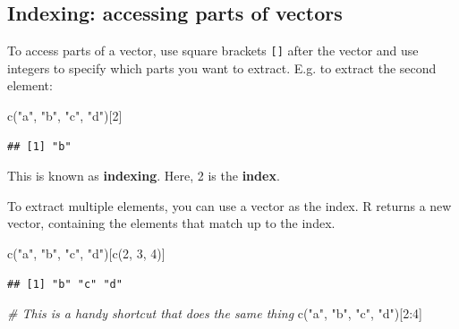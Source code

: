 \documentclass[
]{book}
\newenvironment{Shaded}{\begin{snugshade}}{\end{snugshade}}
\newcommand{\CommentTok}[1]{\textcolor[rgb]{0.56,0.35,0.01}{\textit{#1}}}
\newcommand{\DecValTok}[1]{\textcolor[rgb]{0.00,0.00,0.81}{#1}}
\newcommand{\FunctionTok}[1]{\textcolor[rgb]{0.00,0.00,0.00}{#1}}
\newcommand{\NormalTok}[1]{#1}
\newcommand{\SpecialCharTok}[1]{\textcolor[rgb]{0.00,0.00,0.00}{#1}}
\newcommand{\StringTok}[1]{\textcolor[rgb]{0.31,0.60,0.02}{#1}}
\begin{document}
\hypertarget{indexing-accessing-parts-of-vectors}{%
\subsection{Indexing: accessing parts of vectors}\label{indexing-accessing-parts-of-vectors}}

To access parts of a vector, use square brackets \texttt{{[}{]}} after the vector
and use integers to specify which parts you want to extract. E.g. to
extract the second element:

\begin{Shaded}
\begin{Highlighting}[]
\FunctionTok{c}\NormalTok{(}\StringTok{"a"}\NormalTok{, }\StringTok{"b"}\NormalTok{, }\StringTok{"c"}\NormalTok{, }\StringTok{"d"}\NormalTok{)[}\DecValTok{2}\NormalTok{]}
\end{Highlighting}
\end{Shaded}

\begin{verbatim}
## [1] "b"
\end{verbatim}

This is known as \textbf{indexing}. Here, 2 is the \textbf{index}.

To extract multiple elements, you can use a vector as the index. R
returns a new vector, containing the elements that match up to the index.

\begin{Shaded}
\begin{Highlighting}[]
\FunctionTok{c}\NormalTok{(}\StringTok{"a"}\NormalTok{, }\StringTok{"b"}\NormalTok{, }\StringTok{"c"}\NormalTok{, }\StringTok{"d"}\NormalTok{)[}\FunctionTok{c}\NormalTok{(}\DecValTok{2}\NormalTok{, }\DecValTok{3}\NormalTok{, }\DecValTok{4}\NormalTok{)]}
\end{Highlighting}
\end{Shaded}

\begin{verbatim}
## [1] "b" "c" "d"
\end{verbatim}

\begin{Shaded}
\begin{Highlighting}[]
\CommentTok{\# This is a handy shortcut that does the same thing}
\FunctionTok{c}\NormalTok{(}\StringTok{"a"}\NormalTok{, }\StringTok{"b"}\NormalTok{, }\StringTok{"c"}\NormalTok{, }\StringTok{"d"}\NormalTok{)[}\DecValTok{2}\SpecialCharTok{:}\DecValTok{4}\NormalTok{]}
\end{Highlighting}
\end{Shaded}
\end{document}
